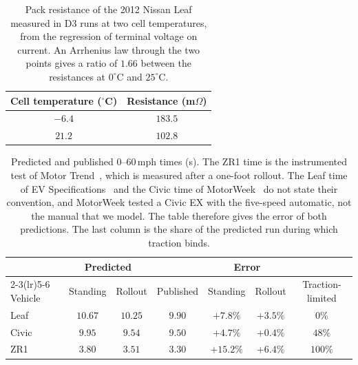 \documentclass[12pt, twoside]{amsart}
\theoremstyle{definition}
\begin{document}
\begin{table}[htbp]
\centering\small
\caption{Pack resistance of the 2012 Nissan Leaf measured in D3 runs at two cell temperatures, from the regression of terminal voltage on current. An Arrhenius law through the two points gives a ratio of $1.66$ between the resistances at $0^\circ$C and $25^\circ$C.}\label{tab:app-battery}
\begin{tabular}{cc}
\toprule
Cell temperature ($^\circ$C) & Resistance (m$\Omega$)\\
\midrule
$-6.4$ & $183.5$\\
$21.2$ & $102.8$\\
\bottomrule
\end{tabular}
\end{table}
\begin{table}[htbp]
\centering\small
\setlength{\tabcolsep}{4pt}
\caption{Predicted and published $0$--$60$\,mph times (s). The ZR1 time is the instrumented test of Motor Trend~\cite{MotorTrendZR1}, which is measured after a one-foot rollout. The Leaf time of EV Specifications~\cite{Leaf2013} and the Civic time of MotorWeek~\cite{Civic2013} do not state their convention, and MotorWeek tested a Civic EX with the five-speed automatic, not the manual that we model. The table therefore gives the error of both predictions. The last column is the share of the predicted run during which traction binds.}\label{tab:app-060}
\begin{tabular}{lcccccc}
\toprule
& \multicolumn{2}{c}{Predicted} & & \multicolumn{2}{c}{Error} & \\
\cmidrule(lr){2-3}\cmidrule(lr){5-6}
Vehicle & Standing & Rollout & Published & Standing & Rollout & Traction-limited\\
\midrule
Leaf & $10.67$ & $10.25$ & $9.90$ & $+7.8\%$ & $+3.5\%$ & $0\%$\\
Civic & $9.95$ & $9.54$ & $9.50$ & $+4.7\%$ & $+0.4\%$ & $48\%$\\
ZR1 & $3.80$ & $3.51$ & $3.30$ & $+15.2\%$ & $+6.4\%$ & $100\%$\\
\bottomrule
\end{tabular}
\end{table}
\FloatBarrier
\end{document}

